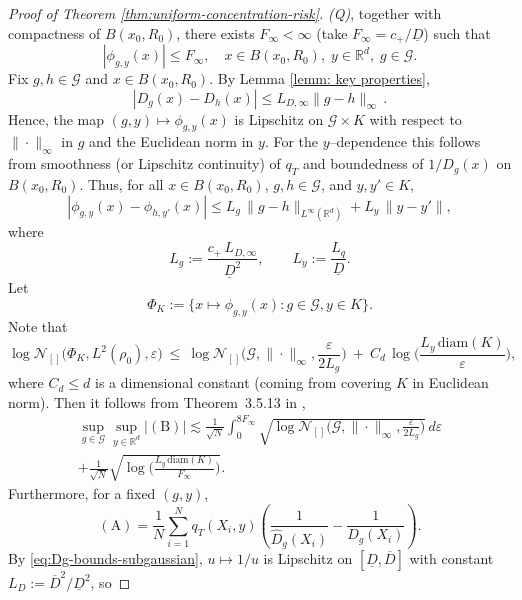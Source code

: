 \documentclass[11pt]{article}
\theoremstyle{remark}
\numberwithin{equation}{section}
\newcommand{\R}{\mathbb{R}}
\begin{document}
\begin{proof}[Proof of Theorem \ref{thm:uniform-concentration-risk}]
\emph{(Q)}, together with compactness of $B(x_0, R_0)$, there exists $F_\infty<\infty$ (take $F_\infty=c_{+}/\underline{D}$) 
such that
\[
  |\phi_{g,y}(x)| \le F_\infty,
  \quad x\in B(x_0, R_0),\; y\in \R^d,\; g\in\mathcal{G}.
\]
 Fix $g,h\in\mathcal{G}$ and $x\in B(x_0, R_0)$. 
By Lemma \ref{lemm: key properties}, 
\[
  |D_g(x)-D_h(x)|
  \le
  L_{D,\infty} \|g-h\|_\infty\, .
\]
Hence, the map $(g,y)\mapsto \phi_{g,y}(x)$ is Lipschitz on $\mathcal{G}\times K$
with respect to $\|\cdot\|_\infty$ in $g$ and the Euclidean norm in $y$. For
the $y$--dependence this follows from smoothness (or Lipschitz continuity)
of $q_T$ and boundedness of $1/D_g(x)$ on $B(x_0, R_0)$.
Thus, for all $x\in B(x_0,R_0)$, $g,h\in\mathcal G$, and $y,y'\in K$,
\begin{equation}\label{eq:phi-Lip}
  |\phi_{g,y}(x)-\phi_{h,y'}(x)|
  \le
  L_g\,\|g-h\|_{L^\infty(\R^d)}
  +L_y\,\|y-y'\|,
\end{equation}
where
\begin{equation}\label{eq:Lg-Ly}
  L_g:=\frac{c_+\,L_{D,\infty}}{\underline D^{2}},
  \qquad
  L_y:=\frac{L_q}{\underline D}.
\end{equation}
Let
\[
  \Phi_K
  :=
  \bigl\{
    x\mapsto \phi_{g,y}(x)
   : g\in\mathcal{G}, y\in K
  \bigr\}.
\]
Note that
\begin{equation}\label{eq:bracketing-PhiK}
  \log \mathcal N_{[]}\!\big(\Phi_K,L^2(\rho_0), \varepsilon\big)
  \ \le\
  \log \mathcal N_{[]}\!\Big(\mathcal G,\|\cdot\|_\infty,\frac{\varepsilon}{2L_g}\Big)
  \ +\
  C_d\,\log\!\Big(\frac{L_y\,\mathrm{diam}(K)}{\varepsilon}\Big),
\end{equation}
where $C_d\le d$ is a dimensional constant (coming from covering $K$ in Euclidean norm).
Then it follows from Theorem~3.5.13 in \cite{GineNickl2016},
\begin{multline}
\label{eq:B-bound}
  \sup_{g\in\mathcal{G}}\sup_{y\in \R^d}|(\mathrm{B})| 
  \lesssim \frac{1}{\sqrt{N}} \int_{0}^{8 F_{\infty}} \sqrt{\log \mathcal N_{[]}\!\Big(\mathcal G,\|\cdot\|_\infty,\frac{\varepsilon}{2L_g}\Big)} \, d\varepsilon
   \\+\frac{1}{\sqrt{N}}\sqrt{\log\!\Big(\frac{L_y\,\mathrm{diam}(K)}{F_\infty}\Big)}.
\end{multline}
Furthermore, for a fixed $(g,y)$,
\[
  (\mathrm{A})
  =
  \frac{1}{N}\sum_{i=1}^N
    q_T(X_i,y)
    \left(
      \frac{1}{\widehat{D}_g(X_i)} - \frac{1}{D_g(X_i)}
    \right).
\]
By \eqref{eq:Dg-bounds-subgaussian}, $u\mapsto 1/u$ is Lipschitz on
$[\underline{D},\overline{D}]$ with constant
$L_D := \overline{D}^2/\underline{D}^2$, so

\end{proof}
\end{document}
